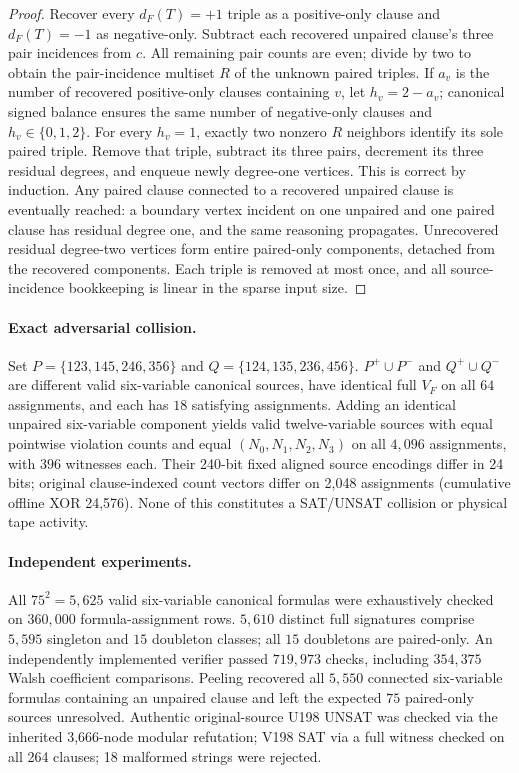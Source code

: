 \documentclass[11pt]{article}
\begin{document}
\begin{proof}
Recover every $d_F(T)=+1$ triple as a positive-only clause and $d_F(T)=-1$ as negative-only. Subtract each recovered unpaired clause's three pair incidences from $c$. All remaining pair counts are even; divide by two to obtain the pair-incidence multiset $R$ of the unknown paired triples. If $a_v$ is the number of recovered positive-only clauses containing $v$, let $h_v=2-a_v$; canonical signed balance ensures the same number of negative-only clauses and $h_v\in\{0,1,2\}$. For every $h_v=1$, exactly two nonzero $R$ neighbors identify its sole paired triple. Remove that triple, subtract its three pairs, decrement its three residual degrees, and enqueue newly degree-one vertices. This is correct by induction. Any paired clause connected to a recovered unpaired clause is eventually reached: a boundary vertex incident on one unpaired and one paired clause has residual degree one, and the same reasoning propagates. Unrecovered residual degree-two vertices form entire paired-only components, detached from the recovered components. Each triple is removed at most once, and all source-incidence bookkeeping is linear in the sparse input size.
\end{proof}
\paragraph{Exact adversarial collision.} Set $P=\{123,145,246,356\}$ and $Q=\{124,135,236,456\}$. $P^+\cup P^-$ and $Q^+\cup Q^-$ are different valid six-variable canonical sources, have identical full $V_F$ on all $64$ assignments, and each has $18$ satisfying assignments. Adding an identical unpaired six-variable component yields valid twelve-variable sources with equal pointwise violation counts and equal $(N_0,N_1,N_2,N_3)$ on all $4,096$ assignments, with $396$ witnesses each. Their 240-bit fixed aligned source encodings differ in 24 bits; original clause-indexed count vectors differ on 2,048 assignments (cumulative offline XOR 24,576). None of this constitutes a SAT/UNSAT collision or physical tape activity.
\paragraph{Independent experiments.} All $75^2=5,625$ valid six-variable canonical formulas were exhaustively checked on $360,000$ formula-assignment rows. $5,610$ distinct full signatures comprise $5,595$ singleton and $15$ doubleton classes; all $15$ doubletons are paired-only. An independently implemented verifier passed $719,973$ checks, including $354,375$ Walsh coefficient comparisons. Peeling recovered all $5,550$ connected six-variable formulas containing an unpaired clause and left the expected $75$ paired-only sources unresolved. Authentic original-source U198 UNSAT was checked via the inherited 3,666-node modular refutation; V198 SAT via a full witness checked on all 264 clauses; 18 malformed strings were rejected.
\end{document}
